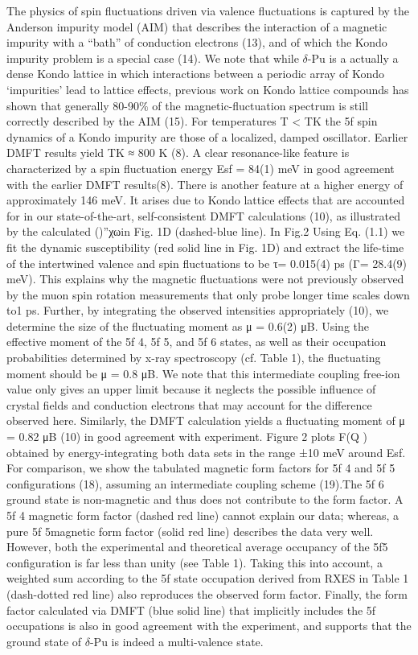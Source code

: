 \documentclass[10pt]{ruthesis}
\begin{document}
{The physics of spin fluctuations driven via valence fluctuations is captured by the Anderson impurity model (AIM) that describes the interaction of a magnetic impurity with a “bath” of conduction electrons (13), and of which the Kondo impurity problem is a special case (14). We note that while $\delta$-Pu is a actually a dense Kondo lattice in which interactions between a periodic array of Kondo ‘impurities’ lead to lattice effects, previous work on Kondo lattice compounds has shown that generally 80-90$\%$ of the magnetic-fluctuation spectrum is still correctly described by the AIM (15). For temperatures T < TK the 5f spin dynamics of a Kondo impurity are those of a localized, damped oscillator. Earlier DMFT results yield TK ≈ 800 K (8). A clear resonance-like feature is characterized by a spin fluctuation energy Esf = 84(1) meV in good agreement with the earlier DMFT results(8). There is another feature at a higher energy of approximately 146 meV. It arises due to Kondo lattice effects that are accounted for in our state-of-the-art, self-consistent DMFT calculations (10), as illustrated by the calculated ()''χωin Fig. 1D (dashed-blue line). In Fig.2 
Using Eq. (1.1) we fit the dynamic susceptibility (red solid line in Fig. 1D) and extract the life-time of the intertwined valence and spin fluctuations to be τ= 0.015(4) ps (Γ= 28.4(9) meV). This explains why the magnetic fluctuations were not previously observed by the muon spin rotation measurements that only probe longer time scales down to1 ps. Further, by integrating the observed intensities appropriately (10), we determine the size of the fluctuating moment as μ = 0.6(2) μB. Using the effective moment of the 5f 4, 5f 5, and 5f 6 states, as well as their occupation probabilities determined by x-ray spectroscopy (cf. Table 1), the fluctuating moment should be μ = 0.8 μB. We note that this intermediate coupling free-ion value only gives an upper limit because it neglects the possible influence of crystal fields and conduction electrons that may account for the difference observed here. Similarly, the DMFT calculation yields a fluctuating moment of μ = 0.82 μB (10) in good agreement with experiment.
Figure 2 plots F(Q ) obtained by energy-integrating both data sets in the range ±10 meV around Esf. For comparison, we show the tabulated magnetic form factors for 5f 4 and 5f 5 configurations (18), assuming an intermediate coupling scheme (19).The 5f 6 ground state is non-magnetic and thus does not contribute to the form factor. A 5f 4 magnetic form factor (dashed red line) cannot explain our data; whereas, a pure 5f 5magnetic form factor (solid red line) describes the data very well. However, both the experimental and theoretical average occupancy of the 5f5 configuration is far less than unity (see Table 1). Taking this into account, a weighted sum according to the 5f state occupation derived from RXES in Table 1 (dash-dotted red line) also reproduces the observed form factor. Finally, the form factor calculated via DMFT (blue solid line) that implicitly includes the 5f occupations is also in good agreement with the experiment, and supports that the ground state of $\delta$-Pu is indeed a multi-valence state.
}
\end{document}
